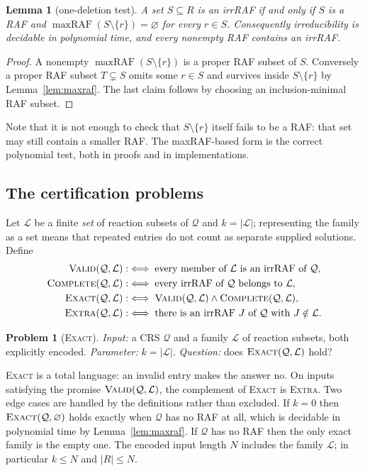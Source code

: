 \documentclass[11pt,a4paper]{article}
\theoremstyle{plain}
\newtheorem{lemma}[theorem]{Lemma}
\theoremstyle{definition}
\newtheorem{problem}[theorem]{Problem}
\theoremstyle{remark}
\newcommand{\maxRAF}{\operatorname{maxRAF}}
\newcommand{\Valid}{\textup{\textsc{Valid}}}
\newcommand{\Complete}{\textup{\textsc{Complete}}}
\newcommand{\Exact}{\textup{\textsc{Exact}}}
\newcommand{\Extra}{\textup{\textsc{Extra}}}
\newcommand{\cL}{\mathcal{L}}
\newcommand{\cQ}{\mathcal{Q}}
\newcommand{\Nlen}{N}
\begin{document}
\begin{lemma}[one-deletion test]\label{lem:one-deletion}
A set $S\subseteq R$ is an irrRAF if and only if $S$ is a RAF and $\maxRAF(S\setminus\{r\})=\varnothing$ for every $r\in S$. Consequently irreducibility is decidable in polynomial time, and every nonempty RAF contains an irrRAF.
\end{lemma}

\begin{proof}
A nonempty $\maxRAF(S\setminus\{r\})$ is a proper RAF subset of $S$. Conversely a proper RAF subset $T\subsetneq S$ omits some $r\in S$ and survives inside $S\setminus\{r\}$ by Lemma~\ref{lem:maxraf}. The last claim follows by choosing an inclusion-minimal RAF subset.
\end{proof}

Note that it is not enough to check that $S\setminus\{r\}$ itself fails to be a RAF: that set may still contain a smaller RAF. The maxRAF-based form is the correct polynomial test, both in proofs and in implementations.

\subsection{The certification problems}\label{sec:problems}

Let $\cL$ be a finite \emph{set} of reaction subsets of $\cQ$ and $k=|\cL|$; representing the family as a set means that repeated entries do not count as separate supplied solutions. Define
\begin{align*}
\Valid(\cQ,\cL) &:\iff \text{every member of $\cL$ is an irrRAF of $\cQ$},\\
\Complete(\cQ,\cL) &:\iff \text{every irrRAF of $\cQ$ belongs to $\cL$},\\
\Exact(\cQ,\cL) &:\iff \Valid(\cQ,\cL)\wedge\Complete(\cQ,\cL),\\
\Extra(\cQ,\cL) &:\iff \text{there is an irrRAF $J$ of $\cQ$ with $J\notin\cL$}.
\end{align*}

\begin{problem}[\Exact]
\emph{Input:} a CRS $\cQ$ and a family $\cL$ of reaction subsets, both explicitly encoded. \emph{Parameter:} $k=|\cL|$. \emph{Question:} does $\Exact(\cQ,\cL)$ hold?
\end{problem}

\Exact{} is a total language: an invalid entry makes the answer no. On inputs satisfying the promise $\Valid(\cQ,\cL)$, the complement of \Exact{} is \Extra. Two edge cases are handled by the definitions rather than excluded. If $k=0$ then $\Exact(\cQ,\varnothing)$ holds exactly when $\cQ$ has no RAF at all, which is decidable in polynomial time by Lemma~\ref{lem:maxraf}. If $\cQ$ has no RAF then the only exact family is the empty one. The encoded input length $\Nlen$ includes the family $\cL$; in particular $k\le\Nlen$ and $|R|\le\Nlen$.
\end{document}
